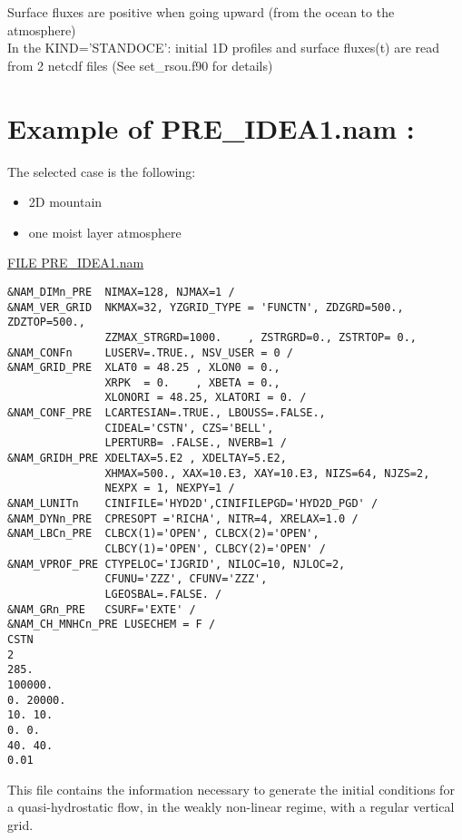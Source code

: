 Surface fluxes are positive when going upward (from the ocean to the atmosphere)  \\

In the KIND='STANDOCE': initial 1D profiles and surface fluxes(t) are read from 2 netcdf files (See set\_rsou.f90 for details)
 

\section{Example of PRE\_IDEA1.nam : }
The selected case is the following:
\begin{itemize}
\item 2D mountain 
\item  one moist  layer atmosphere
\end{itemize}

\underline{FILE PRE\_IDEA1.nam}

\begin{verbatim}
&NAM_DIMn_PRE  NIMAX=128, NJMAX=1 /
&NAM_VER_GRID  NKMAX=32, YZGRID_TYPE = 'FUNCTN', ZDZGRD=500., ZDZTOP=500., 
               ZZMAX_STRGRD=1000.    , ZSTRGRD=0., ZSTRTOP= 0., 
&NAM_CONFn     LUSERV=.TRUE., NSV_USER = 0 /
&NAM_GRID_PRE  XLAT0 = 48.25 , XLON0 = 0.,
               XRPK  = 0.    , XBETA = 0.,
               XLONORI = 48.25, XLATORI = 0. /
&NAM_CONF_PRE  LCARTESIAN=.TRUE., LBOUSS=.FALSE., 
               CIDEAL='CSTN', CZS='BELL', 
               LPERTURB= .FALSE., NVERB=1 /
&NAM_GRIDH_PRE XDELTAX=5.E2 , XDELTAY=5.E2, 
               XHMAX=500., XAX=10.E3, XAY=10.E3, NIZS=64, NJZS=2, 
               NEXPX = 1, NEXPY=1 /
&NAM_LUNITn    CINIFILE='HYD2D',CINIFILEPGD='HYD2D_PGD' /
&NAM_DYNn_PRE  CPRESOPT ='RICHA', NITR=4, XRELAX=1.0 /
&NAM_LBCn_PRE  CLBCX(1)='OPEN', CLBCX(2)='OPEN', 
               CLBCY(1)='OPEN', CLBCY(2)='OPEN' /
&NAM_VPROF_PRE CTYPELOC='IJGRID', NILOC=10, NJLOC=2,  
               CFUNU='ZZZ', CFUNV='ZZZ',
               LGEOSBAL=.FALSE. /
&NAM_GRn_PRE   CSURF='EXTE' /
&NAM_CH_MNHCn_PRE LUSECHEM = F /
CSTN
2
285.
100000.
0. 20000.
10. 10.
0. 0.
40. 40.
0.01
\end{verbatim}

This file contains the  information necessary to generate the initial 
conditions for a quasi-hydrostatic flow, in the weakly
non-linear regime, with a regular vertical grid.

